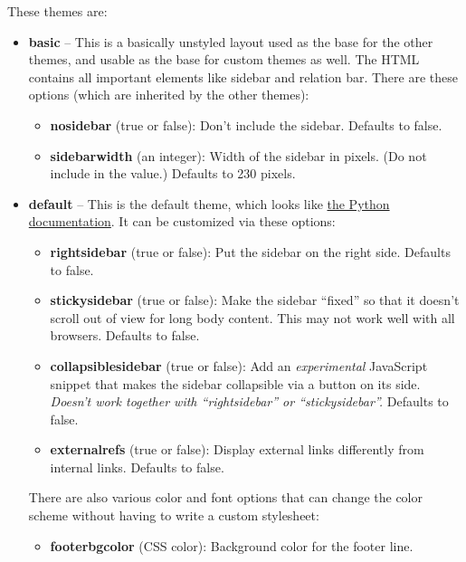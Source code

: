 \documentclass[letterpaper,10pt,english]{sphinxmanual}
\begin{document}
These themes are:
\begin{itemize}
\item {} 
\textbf{basic} -- This is a basically unstyled layout used as the base for the
other themes, and usable as the base for custom themes as well.  The HTML
contains all important elements like sidebar and relation bar.  There are
these options (which are inherited by the other themes):
\begin{itemize}
\item {} 
\textbf{nosidebar} (true or false): Don't include the sidebar.  Defaults to
false.

\item {} 
\textbf{sidebarwidth} (an integer): Width of the sidebar in pixels.  (Do not
include  in the value.)  Defaults to 230 pixels.

\end{itemize}

\item {} 
\textbf{default} -- This is the default theme, which looks like \href{http://docs.python.org/}{the Python
documentation}.  It can be customized via these
options:
\begin{itemize}
\item {} 
\textbf{rightsidebar} (true or false): Put the sidebar on the right side.
Defaults to false.

\item {} 
\textbf{stickysidebar} (true or false): Make the sidebar ``fixed'' so that it
doesn't scroll out of view for long body content.  This may not work well
with all browsers.  Defaults to false.

\item {} 
\textbf{collapsiblesidebar} (true or false): Add an \emph{experimental} JavaScript
snippet that makes the sidebar collapsible via a button on its side.
\emph{Doesn't work together with ``rightsidebar'' or ``stickysidebar''.} Defaults to
false.

\item {} 
\textbf{externalrefs} (true or false): Display external links differently from
internal links.  Defaults to false.

\end{itemize}

There are also various color and font options that can change the color scheme
without having to write a custom stylesheet:
\begin{itemize}
\item {} 
\textbf{footerbgcolor} (CSS color): Background color for the footer line.


\end{itemize}
\end{itemize}
\end{document}
